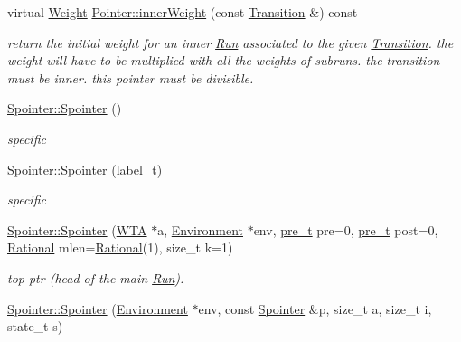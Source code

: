 \begin{DoxyCompactItemize}
\mbox{\label{group__table_gad709430d698804267807f12deba9952b}} 
virtual \mbox{\hyperlink{classWeight}{Weight}} \mbox{\hyperlink{group__table_gad709430d698804267807f12deba9952b}{Pointer\+::inner\+Weight}} (const \mbox{\hyperlink{classTransition}{Transition}} \&) const
\begin{DoxyCompactList}\small\item\em return the initial weight for an inner \mbox{\hyperlink{classRun}{Run}} associated to the given \mbox{\hyperlink{classTransition}{Transition}}. the weight will have to be multiplied with all the weights of subruns. the transition must be inner. this pointer must be divisible. \end{DoxyCompactList}\item 
\mbox{\label{group__table_ga467ee6f93cd0429edb40fc4de100c3c4}} 
\mbox{\hyperlink{group__table_ga467ee6f93cd0429edb40fc4de100c3c4}{Spointer\+::\+Spointer}} ()
\begin{DoxyCompactList}\small\item\em specific \end{DoxyCompactList}\item 
\mbox{\label{group__table_gaad8a647a58df31aefd8f2703b9f86dc5}} 
\mbox{\hyperlink{group__table_gaad8a647a58df31aefd8f2703b9f86dc5}{Spointer\+::\+Spointer}} (\mbox{\hyperlink{group__output_ga22fde970e635fcf63962743b2d5c441d}{label\+\_\+t}})
\begin{DoxyCompactList}\small\item\em specific \end{DoxyCompactList}\item 
\mbox{\hyperlink{group__table_ga49f82b7aafd3ae237243c85272597fa7}{Spointer\+::\+Spointer}} (\mbox{\hyperlink{classWTA}{W\+TA}} $\ast$a, \mbox{\hyperlink{classEnvironment}{Environment}} $\ast$env, \mbox{\hyperlink{group__general_ga092fe8b972dfa977c2a0886720a7731e}{pre\+\_\+t}} pre=0, \mbox{\hyperlink{group__general_ga092fe8b972dfa977c2a0886720a7731e}{pre\+\_\+t}} post=0, \mbox{\hyperlink{classRational}{Rational}} mlen=\mbox{\hyperlink{classRational}{Rational}}(1), size\+\_\+t k=1)
\begin{DoxyCompactList}\small\item\em top ptr (head of the main \mbox{\hyperlink{classRun}{Run}}). \end{DoxyCompactList}\item 
\mbox{\hyperlink{group__table_ga72441f0d67497c90602a123c45dc53d1}{Spointer\+::\+Spointer}} (\mbox{\hyperlink{classEnvironment}{Environment}} $\ast$env, const \mbox{\hyperlink{classSpointer}{Spointer}} \&p, size\+\_\+t a, size\+\_\+t i, state\+\_\+t s)

\end{DoxyCompactItemize}

